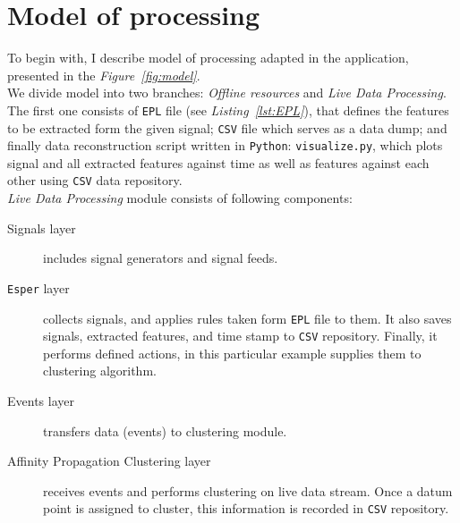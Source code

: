 \documentclass[11pt, letterpaper]{article}            %
\begin{document}
\section{Model of processing}
To begin with, I describe model of processing adapted in the application, presented in the \textit{Figure~\ref{fig:model}}.\\
We divide model into two branches: \emph{Offline resources} and \emph{Live Data Processing}. The first one consists of \texttt{EPL} file (see \textit{Listing~\ref{lst:EPL}}), that defines the features to be extracted form the given signal; \texttt{CSV} file which serves as a data dump; and finally data reconstruction script written in \texttt{Python}: \texttt{visualize.py}, which plots signal and all extracted features against time as well as features against each other using \texttt{CSV} data repository.\\
\emph{Live Data Processing} module consists of following components:
\begin{description}
    \item[Signals layer] includes signal generators and signal feeds.
    \item[\texttt{Esper} layer] collects signals, and applies rules taken form \texttt{EPL} file to them. It also saves signals, extracted features, and time stamp to \texttt{CSV} repository. Finally, it performs defined actions, in this particular example supplies them to clustering algorithm.
    \item[Events layer] transfers data (events) to clustering module.
    \item[Affinity Propagation Clustering layer] receives events and performs clustering on live data stream. Once a datum point is assigned to cluster, this information is recorded in \texttt{CSV} repository.
\end{description}
\end{document}
